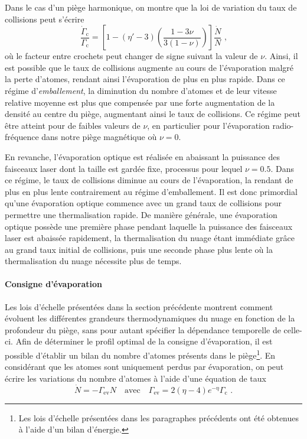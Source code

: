 Dans le cas d'un piège harmonique, on montre que la loi de variation du taux de collisions peut s'écrire \citep{o2001scaling}
\begin{equation}
\frac{\dot{\Gamma}_{\mathrm{c}}}{\Gamma_{\mathrm{c}}}=\left[ 1- (\eta'-3) \left( \frac{1-3\nu}{3(1-\nu)}\right)\right] \frac{\dot{N}}{N} \text{ ,}
\end{equation}
où le facteur entre crochets peut changer de signe suivant la valeur de $\nu$. Ainsi, il est possible que le taux de collisions augmente au cours de l'évaporation malgré la perte d'atomes, rendant ainsi l'évaporation de plus en plus rapide. Dans ce régime d'\emph{emballement}, la diminution du nombre d'atomes et de leur vitesse relative moyenne est plus que compensée par une forte augmentation de la densité au centre du piège, augmentant ainsi le taux de collisions. Ce régime peut être atteint pour de faibles valeurs de $\nu$, en particulier pour l'évaporation radio-fréquence dans notre piège magnétique où $\nu=0$. 

En revanche, l'évaporation optique est réalisée en abaissant la puissance des faisceaux laser dont la taille est gardée fixe, processus pour lequel $\nu=0.5$. Dans ce régime, le taux de collisions diminue au cours de l'évaporation, la rendant de plus en plus lente contrairement au régime d'emballement. Il est donc primordial qu'une évaporation optique commence avec un grand taux de collisions pour permettre une thermalisation rapide. De manière générale, une évaporation optique possède une première phase pendant laquelle la puissance des faisceaux laser est abaissée rapidement, la thermalisation du nuage étant immédiate grâce au grand taux initial de collisions, puis une seconde phase plus lente où la thermalisation du nuage nécessite plus de temps. 


\paragraph*{Consigne d'évaporation}
Les lois d'échelle présentées dans la section précédente montrent comment évoluent les différentes grandeurs thermodynamiques du nuage en fonction de la profondeur du piège, sans pour autant spécifier la dépendance temporelle de celle-ci. Afin de déterminer le profil optimal de la consigne d'évaporation, il est possible d'établir un bilan du nombre d'atomes présents dans le piège\footnote{Les lois d'échelle présentées dans les paragraphes précédents ont été obtenues à l'aide d'un bilan d'énergie.}.
En considérant que les atomes sont uniquement perdus par évaporation, on peut écrire les variations du nombre d'atomes à l'aide d'une équation de taux \citep{luiten1996kinetic,o2001scaling}
\begin{equation}
\dot{N} = - \Gamma_{\mathrm{ev}} N \quad \text{avec} \quad \Gamma_{\mathrm{ev}}=2(\eta-4) e^{-\eta} \Gamma_{\mathrm{c}} \text{ .}
\label{eq:pertes_evap_naturelle}
\end{equation}

